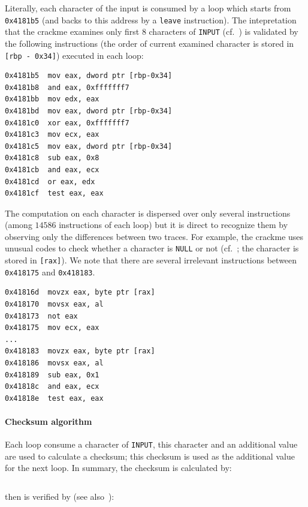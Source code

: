 \documentclass{easychair}
\begin{document}
Literally, each character of the input is consumed by a loop which starts from \texttt{0x4181b5} (and backs to this address by a \texttt{leave} instruction). The intepretation that the crackme examines only first $8$ characters of \texttt{INPUT} (cf.~) is validated by the following instructions (the order of current examined character is stored in \texttt{[rbp - 0x34]}) executed in each loop:
\begin{lstlisting}[frame=lines, caption={Checking if length is $8$}, captionpos=b, boxpos=b, language={[x86masm]Assembler}, label=lst:checklength]
0x4181b5  mov eax, dword ptr [rbp-0x34]
0x4181b8  and eax, 0xfffffff7
0x4181bb  mov edx, eax
0x4181bd  mov eax, dword ptr [rbp-0x34]
0x4181c0  xor eax, 0xfffffff7
0x4181c3  mov ecx, eax
0x4181c5  mov eax, dword ptr [rbp-0x34]
0x4181c8  sub eax, 0x8
0x4181cb  and eax, ecx
0x4181cd  or eax, edx
0x4181cf  test eax, eax
\end{lstlisting}
The computation on each character is dispersed over only several instructions (among $14586$ instructions of each loop) but it is direct to recognize them by observing only the differences between two traces. For example, the crackme uses unusual codes to check whether a character is \texttt{NULL} or not (cf.~; the character is stored in \texttt{[rax]}). We note that there are several irrelevant instructions between \texttt{0x418175} and \texttt{0x418183}.
\begin{lstlisting}[frame=lines, caption={Checking if character is \texttt{NULL}}, captionpos=b, boxpos=b, language={[x86masm]Assembler}, label=lst:checknull]
0x41816d  movzx eax, byte ptr [rax]
0x418170  movsx eax, al
0x418173  not eax
0x418175  mov ecx, eax
...
0x418183  movzx eax, byte ptr [rax]
0x418186  movsx eax, al
0x418189  sub eax, 0x1
0x41818c  and eax, ecx
0x41818e  test eax, eax
\end{lstlisting}

\paragraph{Checksum algorithm}
Each loop consume a character of \texttt{INPUT}, this character and an additional value are used to calculate a checksum; this checksum is used as the additional value for the next loop. In summary, the checksum is calculated by:
\begin{lstlisting}[frame=lines, caption={Calculating checksum}, captionpos=b, boxpos=b, language={[x86masm]Assembler}, label=lst:checksumcalculation]
\end{lstlisting}
then is verified by (see also~):
\begin{lstlisting}[frame=lines, caption={Verifying checksum}, captionpos=b, boxpos=b, language={[x86masm]Assembler}, label=lst:checksumverification]
\end{lstlisting}
\end{document}
